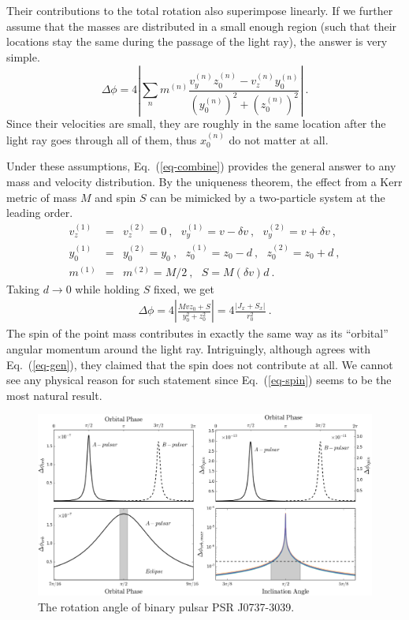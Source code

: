 \documentclass[aps,showpacs,onecolumn,floats,prd,superscriptaddress,nofootinbib]{revtex4}
\begin{document}
Their contributions to the total rotation also superimpose linearly. 
If we further assume that the masses are distributed in a small enough region (such that their locations stay the same during the passage of the light ray), the answer is very simple. 
\begin{equation}
\Delta\phi = 4 \left| \sum_n m^{(n)} \frac{v_y^{(n)}z_0^{(n)} - v_z^{(n)}y_0^{(n)}}
{\left(y_0^{(n)}\right)^2+\left(z_0^{(n)}\right)^2} \right|~.
\label{eq-combine}
\end{equation}
Since their velocities are small, they are roughly in the same location after the light ray goes through all of them, thus $x_0^{(n)}$ do not matter at all. 

Under these assumptions, Eq.~(\ref{eq-combine}) provides the general answer to any mass and velocity distribution. 
By the uniqueness theorem, the effect from a Kerr metric of mass $M$ and spin $S$ can be mimicked by a two-particle system at the leading order.
\begin{eqnarray}
v_z^{(1)} &=& v_z^{(2)} = 0~,  \ \ \ v_y^{(1)} = v -\delta v~, \ \ \ v_y^{(2)} = v + \delta v~, \nonumber \\
y_0^{(1)} &=& y_0^{(2)} = y_0~, \ \ \ z_0^{(1)} = z_0-d~, \ \ \ z_0^{(2)} = z_0 + d~, \\
m^{(1)} &=& m^{(2)} = M/2~, \ \ \ S = M (\delta v) d~. \nonumber
\end{eqnarray}
Taking $d\rightarrow0$ while holding $S$ fixed, we get
\begin{eqnarray}
\Delta \phi = 4\left|\frac{Mvz_0 + S}{y_0^2 + z_0^2}\right| = 4 \frac{\left| J_x + S_x \right|}{r_0^2}~.
\label{eq-spin}
\end{eqnarray}
The spin of the point mass contributes in exactly the same way as its ``orbital'' angular momentum around the light ray. Intriguingly, although \cite{KopMas01} agrees with Eq.~(\ref{eq-gen}), they claimed that the spin does not contribute at all. We cannot see any physical reason for such statement since Eq.~(\ref{eq-spin}) seems to be the most natural result.



\begin{figure}
\includegraphics[width=\textwidth]{rotang.eps}
\caption{\label{fig:rotang}
The rotation angle of binary pulsar PSR J0737-3039.  }
\end{figure}
\end{document}
